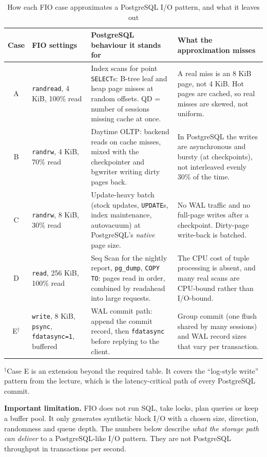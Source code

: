 \documentclass[11pt,a4paper]{article}
\begin{document}
\begin{table}[H]
\centering\small
\caption{How each FIO case approximates a PostgreSQL I/O pattern, and what it leaves out}
\label{tab:map}
\begin{tabularx}{\linewidth}{@{}c>{\raggedright\arraybackslash}p{2.6cm}LL@{}}
\toprule
Case & FIO settings & PostgreSQL behaviour it stands for & What the approximation misses \\
\midrule
A & \texttt{randread}, 4 KiB, 100\% read & Index scans for point \texttt{SELECT}s: B-tree leaf and heap page
  misses at random offsets. QD = number of sessions missing cache at once. & A real miss is an 8 KiB page, not 4 KiB. Hot pages are
  cached, so real misses are skewed, not uniform. \\
B & \texttt{randrw}, 4 KiB, 70\% read & Daytime OLTP: backend reads on cache misses, mixed with
  the checkpointer and bgwriter writing dirty pages back. & In PostgreSQL the writes are asynchronous and bursty (at
  checkpoints), not interleaved evenly 30\% of the time. \\
C & \texttt{randrw}, 8 KiB, 30\% read & Update-heavy batch (stock updates, \texttt{UPDATE}s, index maintenance,
  autovacuum) at PostgreSQL's \emph{native} page size. & No WAL traffic and no full-page writes after a
  checkpoint. Dirty-page write-back is batched. \\
D & \texttt{read}, 256 KiB, 100\% read & Seq Scan for the nightly report, \texttt{pg\_dump}, \texttt{COPY TO}: pages read
  in order, combined by readahead into large requests. & The CPU cost of tuple processing is absent, and many
  real scans are CPU-bound rather than I/O-bound. \\
E$^\dagger$ & \texttt{write}, 8 KiB, \texttt{psync}, \texttt{fdatasync=1}, buffered & WAL commit path: append
  the commit record, then \texttt{fdatasync} before replying to the client. & Group commit (one flush shared by many
  sessions) and WAL record sizes that vary per transaction. \\
\bottomrule
\end{tabularx}
\par\smallskip\footnotesize $^\dagger$Case E is an extension beyond the required table. It covers the ``log-style write''
pattern from the lecture, which is the latency-critical path of every PostgreSQL commit.
\end{table}

\textbf{Important limitation.} FIO does not run SQL, take locks, plan queries or keep a buffer pool.
It only generates synthetic block I/O with a chosen size, direction, randomness and queue depth.
The numbers below describe \emph{what the storage path can deliver} to a PostgreSQL-like I/O pattern. They are
not PostgreSQL throughput in transactions per second.
\end{document}
